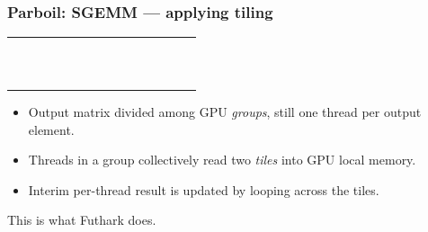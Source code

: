 \documentclass[rgb,dvipsnames]{beamer}
\begin{document}
\begin{frame}
  \frametitle{Parboil: SGEMM --- applying tiling}

  \begin{minipage}{0.49\linewidth}
  \begin{tabular}{|c|c|c|c|c|c|c|c|c|c|c|c|c|c|c|}
    \hline
    &&&&&&&&&&&\\\hline
    &&&&&&&&&&&\\\hline
    &&&&&&&&&&&\\\hline
    &&&&&&&&&&&\\\hline
    &&&&&&&&&&&\\\hline
    &&&&&&&&&&&\\\hline
    &&&\SGgt{}&\SGgt{}&\SGgt{}&&&&\SGt{}&\SGt{}&\SGt{}\\\hline
    &&&\SGgt{}&\SGgt{}&\SGgt{}&&&&\SGt{}&\SGt{}&\SGt{}\\\hline
    &&&\SGgt{}&\SGgt{}&\SGgt{}&&&&\SGt{}&\SGt{}&\SGt{}\\\hline
    &&&\SGt{}&\SGt{}&\SGt{}&&&&&&\\\hline
    &&&\SGt{}&\SGt{}&\SGt{}&&&&&&\\\hline
    &&&\SGt{}&\SGt{}&\SGt{}&&&&&&\\\hline
  \end{tabular}
  \end{minipage}
\begin{minipage}{0.49\linewidth}
  \begin{itemize}
  \item Output matrix divided among GPU \textit{groups}, still one
    thread per output element.
  \item Threads in a group collectively read two \textit{tiles} into
    GPU local memory.
  \item Interim per-thread result is updated by looping across the
    tiles.
  \end{itemize}
\end{minipage}

\pause

\bigskip This is what Futhark does.
\end{frame}
\end{document}
